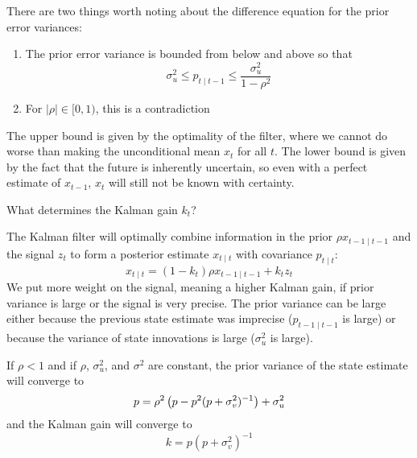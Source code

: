 \documentclass[10pt]{article}
\begin{document}
\begin{remark}
	There are two things worth noting about the difference equation for the prior error variances:
	\begin{enumerate}
		\item The prior error variance is bounded from below and above so that \[\sigma_u^2 \le p_{t\mid t-1} \le \frac{\sigma_u^2}{1-\rho^2}\]
		\item For $|\rho| \in [0,1)$, this is a contradiction
	\end{enumerate}
	The upper bound is given by the optimality of the filter, where we cannot do worse than making the unconditional mean $x_t$ for all $t$. The lower bound is given by the fact that the future is inherently uncertain, so even with a perfect estimate of $x_{t-1}$, $x_t$ will still not be known with certainty.
\end{remark}
\begin{question}
	What determines the Kalman gain $k_t$?
\end{question}
The Kalman filter will optimally combine information in the prior $\rho x_{t-1\mid t-1}$ and the signal $z_t$ to form a posterior estimate $x_{t\mid t}$ with covariance $p_{t\mid t}$:\[x_{t\mid t} = (1-k_t)\rho x_{t-1\mid t-1} + k_tz_t\]We put more weight on the signal, meaning a higher Kalman gain, if prior variance is large or the signal is very precise. The prior variance can be large either because the previous state estimate was imprecise (\ie $p_{t-1\mid t-1}$ is large) or because the variance of state innovations is large (\ie $\sigma_u^2$ is large).

\begin{remark}
	If $\rho < 1$ and if $\rho$, $\sigma^2_u$, and $\sigma^2$ are constant, the prior variance of the state estimate will converge to \[p = \rho^2\left( p - p^2(p+\sigma^2_v)^{-1}\right) + \sigma^2_u\]and the Kalman gain will converge to\[k = p(p+\sigma^2_v)^{-1}\]
\end{remark}
\end{document}
